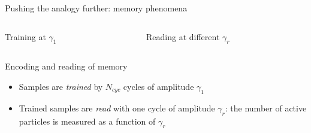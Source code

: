 \documentclass[compress]{beamer}
\begin{document}
	\begin{frame}{Pushing the analogy further: memory phenomena}

		\begin{columns}[T]
			\begin{column}{0.3\textwidth}
				\begin{block}{Training at $\gamma_{1}$}
					\begin{figure}
					\end{figure}
				\end{block}
			\end{column}
			\begin{column}{0.65\textwidth}
				\begin{block}{Reading at different $\gamma_{r}$}
					\begin{figure}
					\end{figure}
				\end{block}
			\end{column}
		\end{columns}
		
		\begin{block}{Encoding and reading of memory}
			
			\begin{itemize}
				\item<2-> Samples are \emph{trained} by $N_{cyc}$ cycles of amplitude $\gamma_{1}$
				\item<3-> Trained samples are \emph{read} with one cycle of amplitude $\gamma_{r}$: the number of active particles is measured as a function of $\gamma_{r}$
			\end{itemize}
			
		\end{block}
		
	\end{frame}
\end{document}
